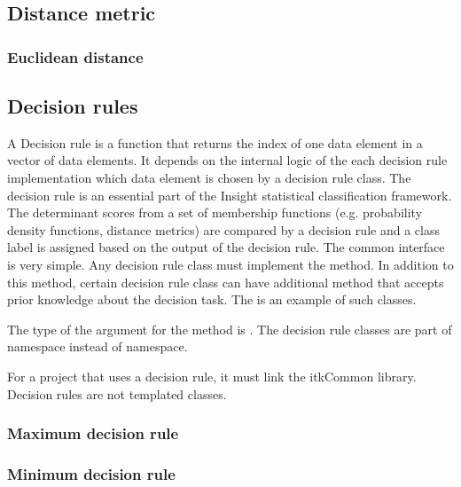 

\subsection{Distance metric}
\label{sec:DistanceMetric}

\subsubsection{Euclidean distance}
\label{sec:EuclideanDistance}



\subsection{Decision rules}
\label{sec:DecisionRules}

A Decision rule is a function that returns the index of one data
element in a vector of data elements. It depends on the internal logic
of the each decision rule implementation which data element is chosen
by a decision rule class. The decision rule is an essential part of
the Insight statistical classification framework. The determinant
scores from a set of membership functions (e.g. probability density
functions, distance metrics) are compared by a decision rule and a
class label is assigned based on the output of the decision rule. The
common interface is very simple. Any decision rule class must
implement the 
method. In addition to this method, certain decision rule class can
have additional method that accepts prior knowledge about the decision
task. The  is an example of such
classes.

The type of the argument for the  method is
. The decision rule classes are part of
 namespace instead of  namespace.

For a project that uses a decision rule, it must link the itkCommon
library. Decision rules are not templated classes.

\subsubsection{Maximum decision rule}
\label{sec:MaximumDecisionRule}



\subsubsection{Minimum decision rule}
\label{sec:MinimumDecisionRule}

